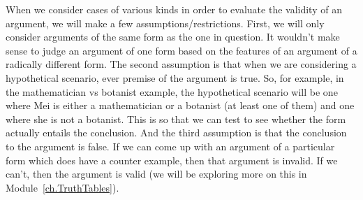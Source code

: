 When we consider cases of various kinds in order to evaluate the validity of an argument, we will make a few assumptions/restrictions. First, we will only consider arguments of the same form as the one in question. It wouldn't make sense to judge an argument of one form based on the features of an argument of a radically different form. The second assumption is that when we are considering a hypothetical scenario, ever premise of the argument is true. So, for example, in the mathematician vs botanist example, the hypothetical scenario will be one where Mei is either a mathematician or a botanist (at least one of them) and one where she is not a botanist. This is so that we can test to see whether the form actually entails the conclusion. And the third assumption is that the conclusion to the argument is false. If we can come up with an argument of a particular form which does have a counter example, then that argument is invalid. If we can't, then the argument is valid (we will be exploring more on this in Module~\ref{ch.TruthTables}).
